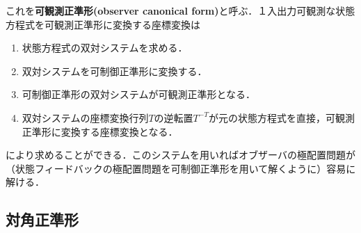 これを{\bf {可観測正準形}(observer canonical form)}と呼ぶ．１入出力可観測な状態方程式を可観測正準形に変換する座標変換は
\begin{enumerate}
  \item 状態方程式の双対システムを求める．
  \item 双対システムを可制御正準形に変換する．
  \item 可制御正準形の双対システムが可観測正準形となる．
  \item 双対システムの座標変換行列$T$の逆転置$T^{-T}$が元の状態方程式を直接，可観測正準形に変換する座標変換となる．
\end{enumerate}
により求めることができる．このシステムを用いればオブザーバの極配置問題が（状態フィードバックの極配置問題を可制御正準形を用いて解くように）容易に解ける．


\subsection{対角正準形}

